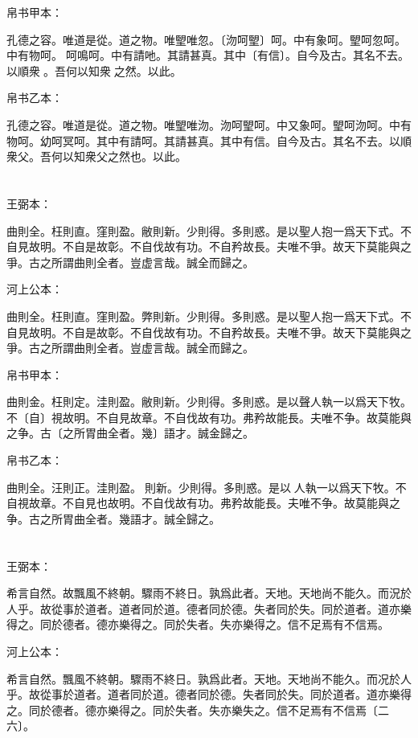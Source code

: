 \documentclass[a5paper]{ctexbook}
\begin{document}
    帛书甲本：

    孔德之容。唯道是從。道之物。唯朢唯忽。〔沕呵朢〕呵。中有象呵。朢呵忽呵。中有物呵。𣾧呵鳴呵。中有請吔。其請甚真。其中〔有信〕。自今及古。其名不去。以順衆𠇑。吾何以知衆𠇑之然。以此。

    帛书乙本：

    孔德之容。唯道是從。道之物。唯朢唯沕。沕呵朢呵。中又象呵。朢呵沕呵。中有物呵。幼呵冥呵。其中有請呵。其請甚真。其中有信。自今及古。其名不去。以順衆父。吾何以知衆父之然也。以此。

    \chapter{}
    王弼本：

    曲則全。枉則直。窪則盈。敝則新。少則得。多則惑。是以聖人抱一爲天下式。不自見故明。不自是故彰。不自伐故有功。不自矜故長。夫唯不爭。故天下莫能與之爭。古之所謂曲則全者。豈虚言哉。誠全而歸之。

    河上公本：

    曲則全。枉則直。窪則盈。弊則新。少則得。多則惑。是以聖人抱一爲天下式。不自見故明。不自是故彰。不自伐故有功。不自矜故長。夫唯不爭。故天下莫能與之爭。古之所謂曲則全者。豈虚言哉。誠全而歸之。

    帛书甲本：

    曲則金。枉則定。洼則盈。敝則新。少則得。多則惑。是以聲人執一以爲天下牧。不〔自〕視故明。不自見故章。不自伐故有功。弗矜故能長。夫唯不争。故莫能與之争。古〔之所胃曲全者。幾〕語才。誠金歸之。

    帛书乙本：

    曲則全。汪則正。洼則盈。𧝬則新。少則得。多則惑。是以𦔻人執一以爲天下牧。不自視故章。不自見也故明。不自伐故有功。弗矜故能長。夫唯不争。故莫能與之争。古之所胃曲全者。幾語才。誠全歸之。

    \chapter{}
    王弼本：

    希言自然。故飄風不終朝。驟雨不終日。孰爲此者。天地。天地尚不能久。而況於人乎。故從事於道者。道者同於道。德者同於德。失者同於失。同於道者。道亦樂得之。同於德者。德亦樂得之。同於失者。失亦樂得之。信不足焉有不信焉。

    河上公本：

    希言自然。飄風不終朝。驟雨不終日。孰爲此者。天地。天地尚不能久。而况於人乎。故從事於道者。道者同於道。德者同於德。失者同於失。同於道者。道亦樂得之。同於德者。德亦樂得之。同於失者。失亦樂失之。信不足焉有不信焉〔二六〕。
\end{document}
